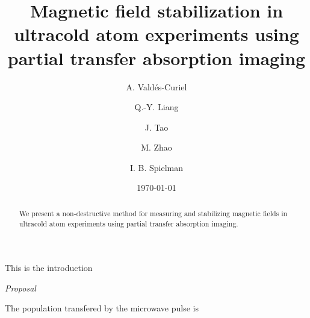 \documentclass[
superscriptaddress,
amsmath,
amssymb,
aps,
prl,
twocolumn,
floatfix
]{revtex4-1}
\begin{document}
\title{Magnetic field stabilization in ultracold atom experiments using partial transfer absorption imaging}



\author{A. Vald\'es-Curiel}
\author{Q.-Y. Liang}
\author{J. Tao}
\author{M. Zhao}

\author{I. B. Spielman}

\date{\today}%

\begin{abstract}
We present a non-destructive method for measuring and stabilizing magnetic fields in ultracold atom experiments using partial transfer absorption imaging. 
\end{abstract}

\maketitle

%
%

This is the introduction

%
%

{\it Proposal} 

The population transfered by the microwave pulse is 
\end{document}
